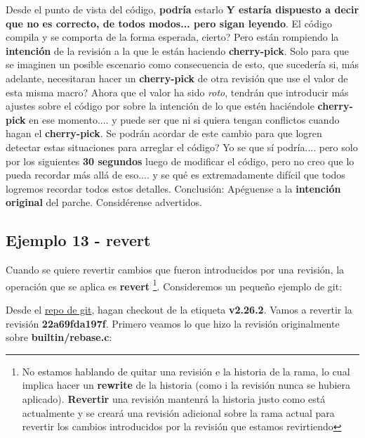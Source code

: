 Desde el punto de vista del código, {\bf podría} estarlo {\bf Y estaría dispuesto a decir que no es correcto, de todos modos... pero
sigan leyendo}. El código compila y se comporta de la forma esperada, cierto? Pero están rompiendo la {\bf intención} de la revisión
a la que le están haciendo {\bf cherry-pick}. Solo para que se imaginen un posible escenario como consecuencia de esto, que sucedería
si, más adelante, necesitaran hacer un {\bf cherry-pick} de otra revisión que use el valor de esta misma macro? Ahora que el valor ha sido
{\it roto}, tendrán que introducir más ajustes sobre el código por sobre la intención de lo que estén haciéndole {\bf cherry-pick}
en ese momento.... y puede ser que ni si quiera tengan conflictos cuando hagan el {\bf cherry-pick}. Se podrán acordar de este cambio
para que logren detectar estas situaciones para arreglar el código? Yo se que sí podría.... pero solo por los siguientes
{\bf 30 segundos} luego de modificar el código, pero no creo que lo pueda recordar más allá de eso.... y se qué es extremadamente
difícil que todos logremos recordar todos estos detalles. Conclusión: Apéguense a la {\bf intención original} del parche.
Considérense advertidos.

\subsection{Ejemplo 13 - revert}
\label{example_13}

Cuando se quiere revertir cambios que fueron introducidos por una revisión, la operación que se aplica es {\bf revert}
\footnote{No estamos hablando de quitar una revisión e la historia de la rama, lo cual implica hacer un {\bf rewrite} de
la historia (como i la revisión nunca se hubiera aplicado). {\bf Revertir} una revisión mantenrá la historia justo como
está actualmente y se creará una revisión adicional sobre la rama actual para revertir los cambios introducidos por la
revisión que estamos revirtiendo}. Consideremos un pequeño ejemplo de git:

Desde el \hyperref[git_repo]{repo de git}, hagan checkout de la etiqueta {\bf v2.26.2}. Vamos a revertir la revisión {\bf 22a69fda197f}.
Primero veamos lo que hizo la revisión originalmente sobre {\bf builtin/rebase.c}:

